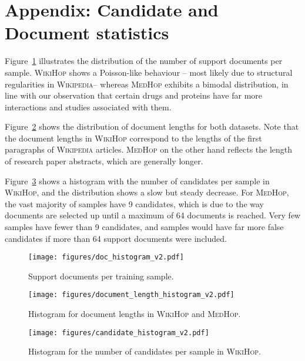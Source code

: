 \documentclass[11pt,letterpaper]{article}
\newcommand{\MedHop}{\textsc{MedHop}\xspace}
\newcommand{\WikiHop}{\textsc{WikiHop}\xspace}
\newcommand{\Wikipedia}{\textsc{Wikipedia}\xspace}
\begin{document}
\section{Appendix: Candidate and Document statistics}\label{appendix:plots}

Figure~\ref{fig:num_supports} illustrates the distribution of the number of support documents per sample.
\WikiHop shows a Poisson-like behaviour -- most likely due to structural regularities in \Wikipedia -- whereas \MedHop exhibits a bimodal distribution, in line with our observation that certain drugs and proteins have far more interactions and studies associated with them.



Figure~\ref{fig:document_lengths} shows the distribution of document lengths for both datasets.
Note that the document lengths in \WikiHop correspond to the lengths of the first paragraphs of \Wikipedia articles.
\MedHop on the other hand reflects the length of research paper abstracts, which are generally longer.


Figure~\ref{fig:candidate_histogram} shows a histogram with the number of candidates per sample in \WikiHop, and the distribution shows a slow but steady decrease.
For \MedHop, the vast majority of samples have 9 candidates, which is due to the way documents are selected up until a maximum of 64 documents is reached.
Very few samples have fewer than 9 candidates, and samples would have far more false candidates if more than 64 support documents were included.




\begin{figure}[t]
    \centering
    \texttt{[image: figures/doc\_histogram\_v2.pdf]}
    \caption{Support documents per training sample.} \label{fig:num_supports}
\end{figure}


\begin{figure}[t]
     \centering
     \texttt{[image: figures/document\_length\_histogram\_v2.pdf]}
     \caption{
         Histogram for document lengths in \WikiHop and \MedHop.
     }
     \label{fig:document_lengths}
 \end{figure}


\begin{figure}[t]
    \centering
    \texttt{[image: figures/candidate\_histogram\_v2.pdf]}
    \caption{
        Histogram for the number of candidates per sample in \WikiHop.
    }
    \label{fig:candidate_histogram}
\end{figure}
\end{document}
